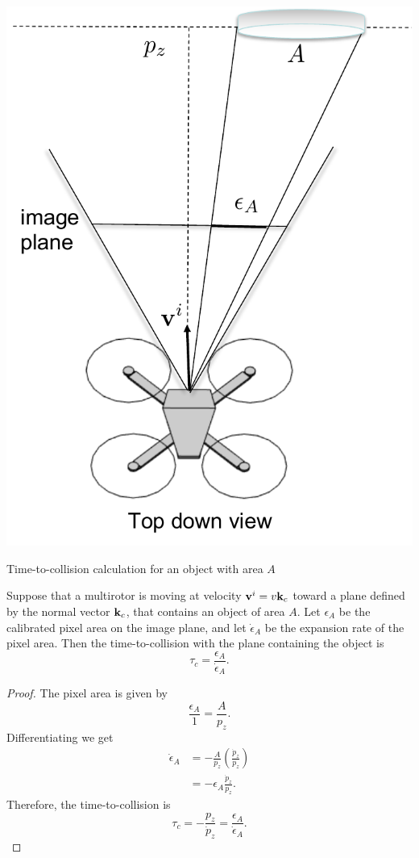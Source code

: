 \begin{marginfigure}
	\includegraphics[width=\linewidth]{chap7_optical_flow/figures/optical_flow_time_to_collision_area}
	\caption{Time-to-collision calculation for an object with area $A$}
	\label{fig:optical_flow_time_to_collision_area}
\end{marginfigure}  
\begin{theorem}
	Suppose that a multirotor is moving at velocity $\mathbf{v}^i = v\mathbf{k}_c$ toward a plane defined by the normal vector $\mathbf{k}_c$, that contains an object of area $A$.  Let $\epsilon_A$ be the calibrated pixel area on the image plane, and let $\dot{\epsilon}_A$ be the expansion rate of the pixel area.  Then the time-to-collision with the plane containing the object is
	\begin{equation}\label{eq:optical_flow_time_to_collision_area}
	\tau_c = \frac{\epsilon_A}{\dot{\epsilon}_A}.
	\end{equation}
\end{theorem}
\begin{proof}
	The pixel area is given by
	\[
	\frac{\epsilon_A}{1} = \frac{A}{p_z}.
	\]
	Differentiating we get
	\begin{align*}
	\dot{\epsilon}_A &= -\frac{A}{p_z}\left(\frac{\dot{p}_z}{p_z}\right) \\
	&= -\epsilon_A \frac{\dot{p}_z}{p_z}.
	\end{align*}
	Therefore, the time-to-collision is
	\[
	\tau_c = -\frac{p_z}{\dot{p}_z} = \frac{\epsilon_A}{\dot{\epsilon}_A}.
	\]
\end{proof}

